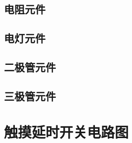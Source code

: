 \subsection{电阻元件}

\subsection{电灯元件}

\subsection{二极管元件}

\subsection{三极管元件}

\section{触摸延时开关电路图}
\endinput